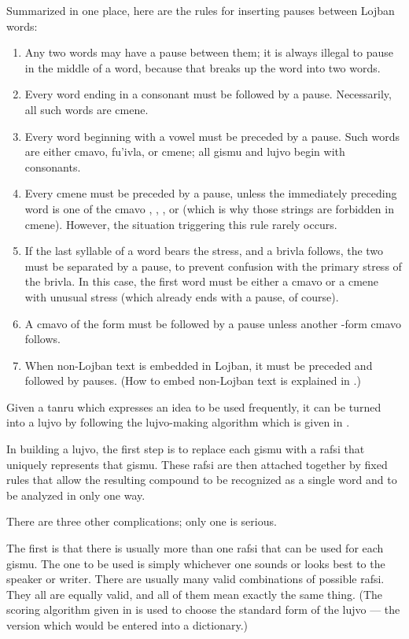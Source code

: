 Summarized in one place, here are the rules for inserting pauses between Lojban words:
\begin{enumerate}
\item Any two words may have a pause between them; it is always illegal to pause in the middle of a word, because that breaks up the word into two words.
\item Every word ending in a consonant must be followed by a pause. Necessarily, all such words are cmene.
\item Every word beginning with a vowel must be preceded by a pause. Such words are either cmavo, fu'ivla, or cmene; all gismu and lujvo begin with consonants.
\item Every cmene must be preceded by a pause, unless the immediately preceding word is one of the cmavo , , , or  (which is why those strings are forbidden in cmene). However, the situation triggering this rule rarely occurs.
\item If the last syllable of a word bears the stress, and a brivla follows, the two must be separated by a pause, to prevent confusion with the primary stress of the brivla. In this case, the first word must be either a cmavo or a cmene with unusual stress (which already ends with a pause, of course).
\item A cmavo of the form  must be followed by a pause unless another -form cmavo follows.
\item When non-Lojban text is embedded in Lojban, it must be preceded and followed by pauses. (How to embed non-Lojban text is explained in .)
\end{enumerate}



Given a tanru which expresses an idea to be used frequently, it can be turned into a lujvo by following the lujvo-making algorithm which is given in .

In building a lujvo, the first step is to replace each gismu with a rafsi that uniquely represents that gismu. These rafsi are then attached together by fixed rules that allow the resulting compound to be recognized as a single word and to be analyzed in only one way.

There are three other complications; only one is serious.

The first is that there is usually more than one rafsi that can be used for each gismu. The one to be used is simply whichever one sounds or looks best to the speaker or writer. There are usually many valid combinations of possible rafsi. They all are equally valid, and all of them mean exactly the same thing. (The scoring algorithm given in  is used to choose the standard form of the lujvo --- the version which would be entered into a dictionary.)

